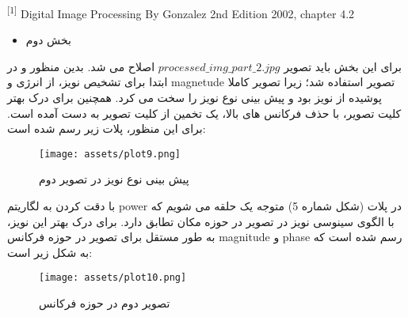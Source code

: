 \documentclass[a4paper,12pt]{article}
\begin{document}
\vfill
\hline
\begin{LTR}
	\begin{latin}
		\begin{center}
			\begin{minipage}{0.9\linewidth}
				\small %
				\textsuperscript{[1]} Digital Image Processing By Gonzalez 2nd Edition 2002, chapter 4.2
			\end{minipage}
		\end{center}
	\end{latin}
\end{LTR}
%
%
\pagebreak
\begin{itemize}
\item 
بخش دوم
\end{itemize}

برای این بخش باید تصویر 
$processed\_img\_part\_2.jpg$
اصلاح می شد. بدین منظور و در ابتدا برای تشخیص نویز، از انرژی و magnetude تصویر استفاده شد؛ زیرا تصویر کاملا پوشیده از نویز بود و پیش بینی نوع نویز را سخت می کرد. همچنین برای درک بهتر کلیت تصویر، با حذف فرکانس های بالا، یک تخمین از کلیت تصویر به دست آمده است. برای این منظور، پلات زیر رسم شده است:
\begin{figure}[h]
	\centering
	\texttt{[image: assets/plot9.png]}
	\caption{\textcolor{CustomAccent}{پیش بینی نوع نویز در تصویر دوم}}
\end{figure}


با دقت کردن به لگاریتم power در پلات (شکل شماره 5) متوجه یک حلقه می شویم که با الگوی سینوسی نویز در تصویر در حوزه مکان تطابق دارد. برای درک بهتر این نویز، به طور مستقل برای تصویر در حوزه فرکانس magnitude و phase رسم شده است که به شکل زیر است:


\begin{figure}[h]
	\centering
	\texttt{[image: assets/plot10.png]}
	\caption{\textcolor{CustomAccent}{تصویر دوم در حوزه فرکانس}}
\end{figure}
\end{document}

